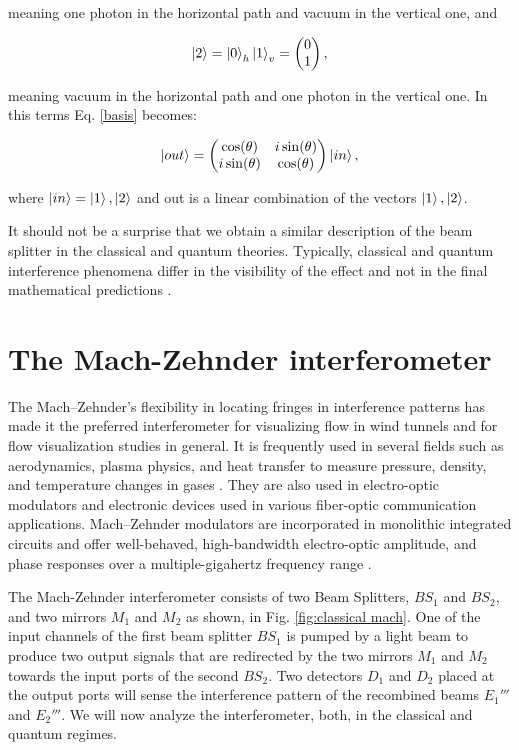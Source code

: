 \documentclass[12pt]{book}
\begin{document}
 meaning one photon in the horizontal path and vacuum in the vertical one, and
 
 \begin{equation}
 \ket{2}=\ket{0}_{h}\ket{1}_{v}=\begin{pmatrix} 0 \\1 \end{pmatrix},
 \end{equation}
 
meaning vacuum  in the horizontal path and one photon in the vertical one. In this terms Eq. \ref{basis} becomes:

\begin{equation}
\ket{out}=\begin{pmatrix} \cos(\theta) & i \sin(\theta) \\ i \sin(\theta) & \cos(\theta) \end{pmatrix} \ket{in},
\end{equation}

where $\ket{in}=\ket{1},\ket{2}$ and out is a linear combination of the vectors $\ket{1},\ket{2}$.

 It should not be a surprise that we obtain a similar description of the beam splitter in the classical and quantum theories. Typically, classical and quantum interference phenomena differ in the visibility of the effect and not in the final mathematical predictions \cite{leonhardt}.

\pagebreak

\chapter{The Mach-Zehnder interferometer }


 The Mach–Zehnder's flexibility in locating fringes in interference patterns has made it the preferred interferometer for visualizing flow in wind tunnels \cite{10} and for flow visualization studies in general. It is frequently used in several fields such as aerodynamics, plasma physics, and heat transfer to measure pressure, density, and temperature changes in gases \cite{11}. They are also used in electro-optic modulators \cite{ackerman} and electronic devices used in various fiber-optic communication applications. Mach–Zehnder modulators are incorporated in monolithic integrated circuits and offer well-behaved, high-bandwidth electro-optic amplitude, and phase responses over a multiple-gigahertz frequency range \cite{studenkov,capmany}.

The Mach-Zehnder interferometer consists of two Beam Splitters, $BS_{1}$ and $BS_{2}$, and two mirrors $M_{1}$ and $M_{2}$ as shown, in Fig. \ref{fig:classical mach}. One of the input channels of the first beam splitter $BS_{1}$ is pumped by a light beam to produce two output signals that are redirected by the two mirrors $M_{1}$ and $M_{2}$ towards the input ports of the second $BS_{2}$.  Two detectors $D_{1}$ and $D_{2}$ placed at the output ports will  sense the interference pattern of the recombined beams $E_{1}'''$ and $E_{2}'''$. We will now analyze the interferometer, both, in the classical and quantum regimes.
\end{document}
